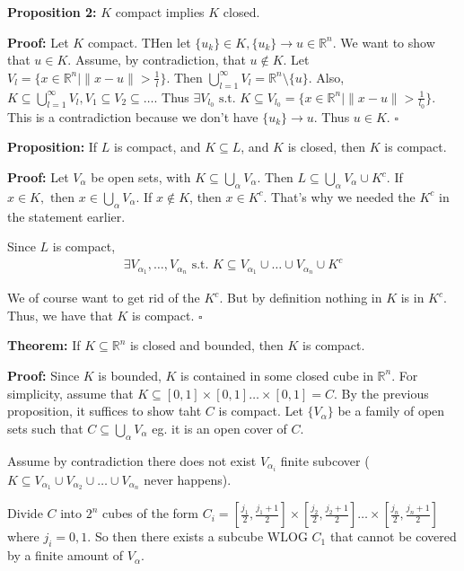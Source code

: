 \documentclass{article}
\newcommand*{\qed}{\hfill$\square$}%
\newcommand*{\txt}[1]{\text{ #1 }}%
\newcommand*{\rr}{\mathbb{R}}%
\begin{document}
\textbf{Proposition 2:} $K$ compact implies $K$ closed. 

\textbf{Proof:} Let $K$ compact. THen let $\{u_k\}\in K, \{u_k\}\to u\in \rr^n$. We want to show that $u\in K$. Assume, by contradiction, that $u\notin K$. Let $V_{l}=\{x\in \rr^n|\|x-u\|>\frac{1}{l}\}$. Then $\bigcup_{l=1}^\infty V_l=\rr^n\setminus \{u\}$. Also, $K\subseteq \bigcup_{l=1}^\infty V_l, V_1\subseteq V_2\subseteq\dots$. Thus $\exists V_{l_0}\txt{s.t.}K\subseteq V_{l_0}=\{x\in\rr^n|\|x-u\|>\frac{1}{l_0}\}$. This is a contradiction because we don't have $\{u_k\}\to u$. Thus $u\in K$. \qed

\textbf{Proposition:} If $L$ is compact, and $K\subseteq L$, and $K$ is closed, then $K$ is compact. 

\textbf{Proof:} Let $V_\alpha$ be open sets, with $K\subseteq \bigcup_{\alpha}V_\alpha$. Then $L\subseteq \bigcup_{\alpha}V_\alpha\cup K^c$. If $x\in K,\txt{then}x\in \bigcup_{\alpha}V_\alpha$. If $x\notin K$, then $x\in K^c$. That's why we needed the $K^c$ in the statement earlier. 

Since $L$ is compact, \begin{align*}
    \exists V_{\alpha_1},\dots,V_{\alpha_n}\txt{s.t.}K\subseteq V_{\alpha_1}\cup\dots\cup V_{\alpha_n}\cup K^c
\end{align*}

We of course want to get rid of the $K^c$. But by definition nothing in $K$ is in $K^c$. Thus, we have that $K$ is compact. \qed

\textbf{Theorem:} If $K\subseteq \rr^n$ is closed and bounded, then $K$ is compact. 

\textbf{Proof:} Since $K$ is bounded, $K$ is contained in some closed cube in $\rr^n$. For simplicity, assume that $K\subseteq[0,1]\times[0,1]\dots\times[0,1]=C$. By the previous proposition, it suffices to show taht $C$ is compact. Let $\{V_\alpha\}$ be a family of open sets such that $C\subseteq \bigcup_{\alpha}V_\alpha$ eg. it is an open cover of $C$.

Assume by contradiction there does not exist $V_{\alpha_i}$ finite subcover ($K\subseteq V_{\alpha_1}\cup V_{\alpha_2}\cup\dots\cup V_{\alpha_n}$ never happens). 

Divide $C$ into $2^n$ cubes of the form $C_i=[\frac{j_1}{2},\frac{j_1+1}{2}]\times[\frac{j_2}{2},\frac{j_2+1}{2}]\dots\times[\frac{j_n}{2},\frac{j_n+1}{2}]$ where $j_i=0,1$. So then there exists a subcube WLOG $C_1$ that cannot be covered by a finite amount of $V_\alpha$. 
\end{document}
